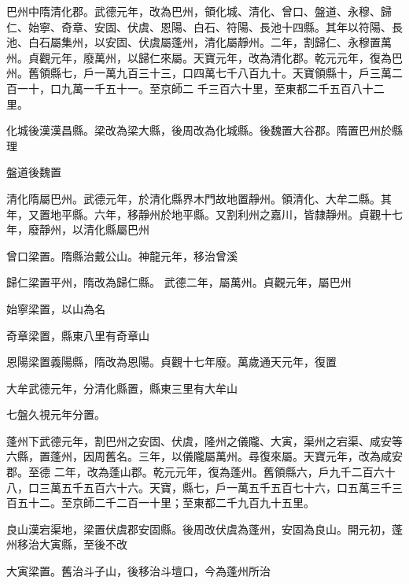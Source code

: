 \begin{pinyinscope}
 巴州中隋清化郡。武德元年，改為巴州，領化城、清化、曾口、盤道、永穆、歸仁、始寧、奇章、安固、伏虞、恩陽、白石、符陽、長池十四縣。其年以符陽、長池、白石屬集州，以安固、伏虞屬蓬州，清化屬靜州。二年，割歸仁、永穆置萬州。貞觀元年，廢萬州，以歸仁來屬。天寶元年，改為清化郡。乾元元年，復為巴州。舊領縣七，戶一萬九百三十三，口四萬七千八百九十。天寶領縣十，戶三萬二百一十，口九萬一千五十一。至京師二
 千三百六十里，至東都二千五百八十二里。



 化城後漢漢昌縣。梁改為梁大縣，後周改為化城縣。後魏置大谷郡。隋置巴州於縣理



 盤道後魏置



 清化隋屬巴州。武德元年，於清化縣界木門故地置靜州。領清化、大牟二縣。其年，又置地平縣。六年，移靜州於地平縣。又割利州之嘉川，皆隸靜州。貞觀十七年，廢靜州，以清化縣屬巴州



 曾口梁置。隋縣治戴公山。神龍元年，移治曾溪



 歸仁梁置平州，隋改為歸仁縣。
 武德二年，屬萬州。貞觀元年，屬巴州



 始寧梁置，以山為名



 奇章梁置，縣東八里有奇章山



 恩陽梁置義陽縣，隋改為恩陽。貞觀十七年廢。萬歲通天元年，復置



 大牟武德元年，分清化縣置，縣東三里有大牟山



 七盤久視元年分置。



 蓬州下武德元年，割巴州之安固、伏虞，隆州之儀隴、大寅，渠州之宕渠、咸安等六縣，置蓬州，因周舊名。三年，以儀隴屬萬州。尋復來屬。天寶元年，改為咸安郡。至德
 二年，改為蓬山郡。乾元元年，復為蓬州。舊領縣六，戶九千二百六十八，口三萬五千五百六十六。天寶，縣七，戶一萬五千五百七十六，口五萬三千三百五十二。至京師二千二百一十里；至東都二千九百九十五里。



 良山漢宕渠地，梁置伏虞郡安固縣。後周改伏虞為蓬州，安固為良山。開元初，蓬州移治大寅縣，至後不改



 大寅梁置。舊治斗子山，後移治斗壇口，今為蓬州所治




\end{pinyinscope}
